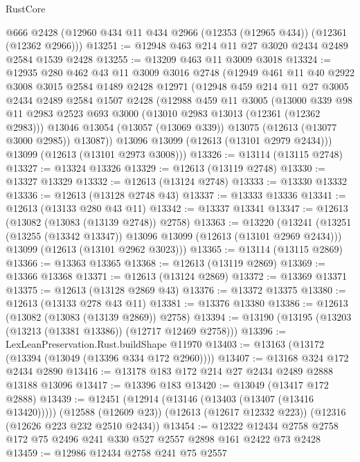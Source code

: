 \begin{lexlean}{RustCore}
\begin{coremodule}
    @666
    @2428
    (@12960 @434 @11 @434 @2966 (@12353 (@12965 @434)) (@12361 (@12362 @2966)))
@13251 := @12948 @463 @214 @11 @27 @3020 @2434 @2489 @2584 @1539 @2428
@13255 := @13209 @463 @11 @3009 @3018
@13324 := @12935
    @280
    @462
    @43
    @11
    @3009
    @3016
    @2748
    (@12949
      @461
      @11
      @40
      @2922
      @3008
      @3015
      @2584
      @1489
      @2428
      @12971
      (@12948
        @459
        @214
        @11
        @27
        @3005
        @2434
        @2489
        @2584
        @1507
        @2428
        (@12988
          @459
          @11
          @3005
          (@13000
            @339
            @98
            @11
            @2983
            @2523
            @693
            @3000
            (@13010 @2983 @13013 (@12361 (@12362 @2983)))
            @13046
            @13054
            (@13057 (@13069 @339))
            @13075
            (@12613 (@13077 @3000 @2985))
            @13087))
        @13096
        @13099
        (@12613 (@13101 @2979 @2434)))
      @13099
      (@12613 (@13101 @2973 @3008)))
@13326 := @13114 (@13115 @2748)
@13327 := @13324 @13326
@13329 := @12613 (@13119 @2748)
@13330 := @13327 @13329
@13332 := @12613 (@13124 @2748)
@13333 := @13330 @13332
@13336 := @12613 (@13128 @2748 @43)
@13337 := @13333 @13336
@13341 := @12613 (@13133 @280 @43 @11)
@13342 := @13337 @13341
@13347 := @12613 (@13082 (@13083 (@13139 @2748)) @2758)
@13363 := @13220
    (@13241
      (@13251 (@13255 (@13342 @13347)) @13096 @13099 (@12613 (@13101 @2969 @2434)))
      @13099
      (@12613 (@13101 @2962 @3023)))
@13365 := @13114 (@13115 @2869)
@13366 := @13363 @13365
@13368 := @12613 (@13119 @2869)
@13369 := @13366 @13368
@13371 := @12613 (@13124 @2869)
@13372 := @13369 @13371
@13375 := @12613 (@13128 @2869 @43)
@13376 := @13372 @13375
@13380 := @12613 (@13133 @278 @43 @11)
@13381 := @13376 @13380
@13386 := @12613 (@13082 (@13083 (@13139 @2869)) @2758)
@13394 := @13190 (@13195 (@13203 (@13213 (@13381 @13386)) (@12717 @12469 @2758)))
@13396 := LexLeanPreservation.Rust.buildShape @11970
@13403 := @13163 (@13172 (@13394 (@13049 (@13396 @334 @172 @2960))))
@13407 := @13168 @324 @172 @2434 @2890
@13416 := @13178 @183 @172 @214 @27 @2434 @2489 @2888 @13188 @13096
@13417 := @13396 @183
@13420 := @13049 (@13417 @172 @2888)
@13439 := @12451
    (@12914 (@13146 (@13403 (@13407 (@13416 @13420)))))
    (@12588 (@12609 @23))
    (@12613 (@12617 @12332 @223))
    (@12316 (@12626 @223 @232 @2510 @2434))
@13454 := @12322 @12434 @2758 @2758 @172 @75 @2496 @241 @330 @527 @2557 @2898 @161 @2422 @73 @2428
@13459 := @12986 @12434 @2758 @241 @75 @2557

\end{coremodule}
\end{lexlean}
